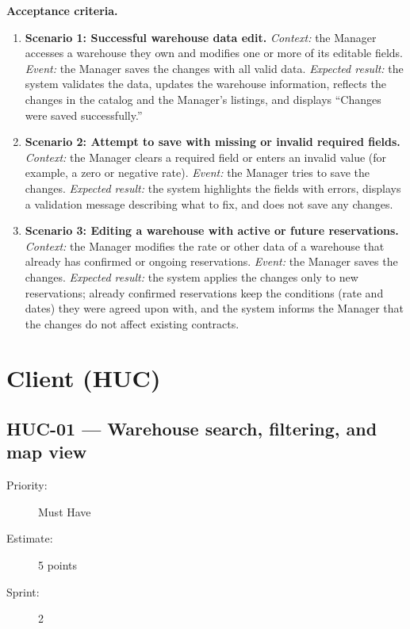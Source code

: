 \documentclass[11pt,a4paper,oneside]{report}
\begin{document}
\textbf{Acceptance criteria.}
\begin{enumerate}
\item \textbf{Scenario 1: Successful warehouse data edit.} \emph{Context:} the Manager accesses a warehouse they own and modifies one or more of its editable fields. \emph{Event:} the Manager saves the changes with all valid data. \emph{Expected result:} the system validates the data, updates the warehouse information, reflects the changes in the catalog and the Manager's listings, and displays ``Changes were saved successfully.''
\item \textbf{Scenario 2: Attempt to save with missing or invalid required fields.} \emph{Context:} the Manager clears a required field or enters an invalid value (for example, a zero or negative rate). \emph{Event:} the Manager tries to save the changes. \emph{Expected result:} the system highlights the fields with errors, displays a validation message describing what to fix, and does not save any changes.
\item \textbf{Scenario 3: Editing a warehouse with active or future reservations.} \emph{Context:} the Manager modifies the rate or other data of a warehouse that already has confirmed or ongoing reservations. \emph{Event:} the Manager saves the changes. \emph{Expected result:} the system applies the changes only to new reservations; already confirmed reservations keep the conditions (rate and dates) they were agreed upon with, and the system informs the Manager that the changes do not affect existing contracts.
\end{enumerate}

\section{Client (HUC)}

\subsection{HUC-01 --- Warehouse search, filtering, and map view}
\label{req:HUC-01}
\begin{description}
\item[Priority:] Must Have \quad \item[Estimate:] 5 points \quad \item[Sprint:] 2
\end{description}
\end{document}
